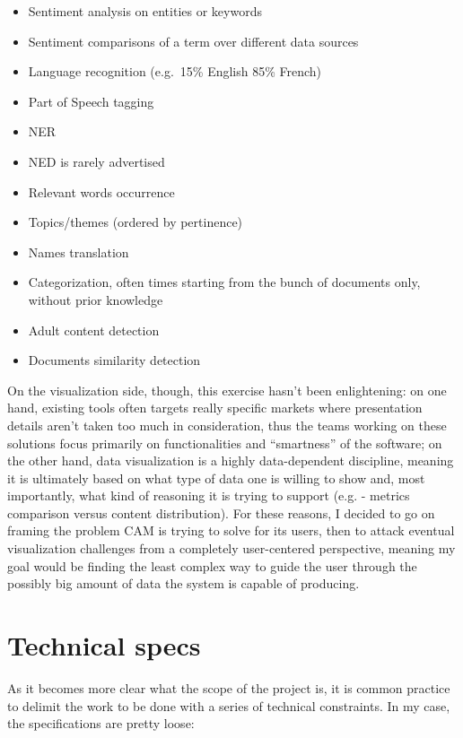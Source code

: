 \documentclass[12pt,svgnames]{memoir}
\begin{document}
\begin{itemize}
\itemsep1pt\parskip0pt
\item
  Sentiment analysis on entities or keywords
\item
  Sentiment comparisons of a term over different data sources
\item
  Language recognition (e.g.~15\% English 85\% French)
\item
  Part of Speech tagging
\item
  NER
\item
  NED is rarely advertised
\item
  Relevant words occurrence
\item
  Topics/themes (ordered by pertinence)
\item
  Names translation
\item
  Categorization, often times starting from the bunch of documents only,
  without prior knowledge
\item
  Adult content detection
\item
  Documents similarity detection
\end{itemize}

On the visualization side, though, this exercise hasn't been
enlightening: on one hand, existing tools often targets really specific
markets where presentation details aren't taken too much in
consideration, thus the teams working on these solutions focus primarily
on functionalities and ``smartness'' of the software; on the other hand,
data visualization is a highly data-dependent discipline, meaning it is
ultimately based on what type of data one is willing to show and, most
importantly, what kind of reasoning it is trying to support (e.g. -
metrics comparison versus content distribution). For these reasons, I
decided to go on framing the problem CAM is trying to solve for its
users, then to attack eventual visualization challenges from a
completely user-centered perspective, meaning my goal would be finding
the least complex way to guide the user through the possibly big amount
of data the system is capable of producing.

\section{Technical specs}\label{technical-specs}

As it becomes more clear what the scope of the project is, it is common
practice to delimit the work to be done with a series of technical
constraints. In my case, the specifications are pretty loose:
\end{document}
